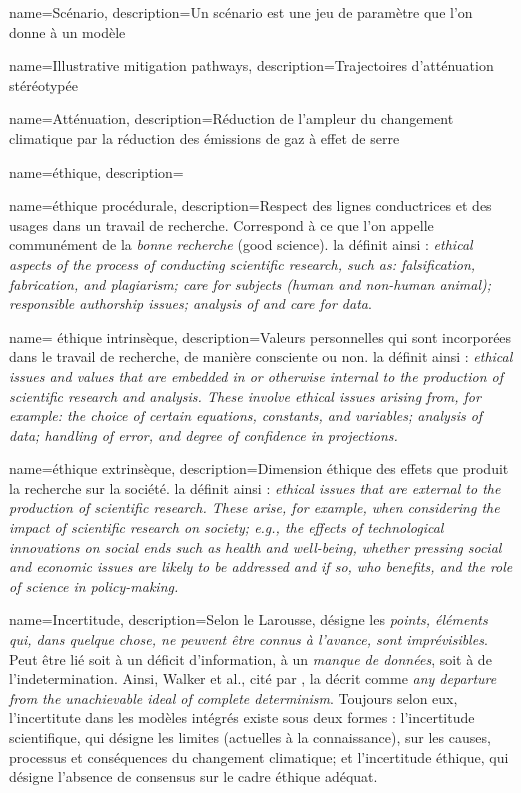 {
    name=Scénario, 
    description={Un scénario est une jeu de paramètre que l'on donne à un modèle}
}

{
    name=Illustrative mitigation pathways, 
    description={Trajectoires d'atténuation stéréotypée}
}

{
    name=Atténuation, 
    description={Réduction de l'ampleur du changement climatique par la réduction des émissions de gaz à effet de serre}
}


{
    name=éthique, 
    description={}
}

{
    name=éthique procédurale, 
    description={Respect des lignes conductrices et des usages dans un travail de recherche. Correspond à ce que l'on appelle communément de la \textit{bonne recherche} (good science). \cite{tuana_leading_2010} la définit ainsi : \textit{ethical aspects of the process of conducting scientific research, such as: falsification, fabrication, and plagiarism; care for subjects (human and non-human animal); responsible authorship issues; analysis of and care for data}.}
}

{
    name= éthique intrinsèque, 
    description={Valeurs personnelles qui sont incorporées dans le travail de recherche, de manière consciente ou non. \cite{tuana_leading_2010} la définit ainsi : \textit{ethical issues and values that are embedded in or otherwise internal to the production of scientific research and analysis. These involve ethical issues arising from, for example: the choice of certain equations, constants, and variables; analysis of data; handling of error, and degree of confidence in projections.}}
}

{
    name=éthique extrinsèque, 
    description={Dimension éthique des effets que produit la recherche sur la société. \cite{tuana_leading_2010} la définit ainsi : \textit{ethical issues that are external to the production of scientific research. These arise, for example, when considering the impact of scientific research on society; e.g., the effects of technological innovations on social ends such as health and well-being, whether pressing social and economic issues are likely to be addressed and if so, who benefits, and the role of science in policy-making.}}
}

{
    name=Incertitude, 
    description={Selon le Larousse, désigne les \emph{points, éléments qui, dans quelque chose, ne peuvent être connus à l'avance, sont imprévisibles}. Peut être lié soit à un déficit d'information, à un \emph{manque de données}, soit à de l'indetermination. Ainsi, Walker et al., cité par \cite{beck_epistemic_2016}, la décrit comme \emph{any departure from the unachievable ideal of complete determinism}. Toujours selon eux, l'incertitute dans les modèles intégrés existe sous deux formes : l'incertitude scientifique, qui désigne les limites (actuelles à la connaissance), sur les causes, processus et conséquences du changement climatique; et l'incertitude éthique, qui désigne l'absence de consensus sur le cadre éthique adéquat.}
}





